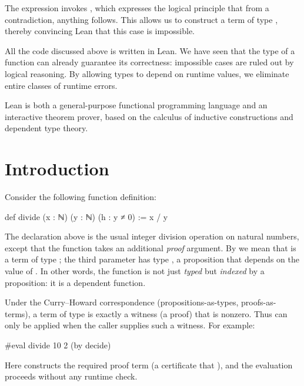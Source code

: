 The expression  invokes , which expresses
the logical principle that from a contradiction, anything follows. This allows us to construct a
term of type , thereby convincing Lean that this case is impossible.

\bigskip

All the code discussed above is written in Lean. We have seen that the type of a function can
already guarantee its correctness: impossible cases are ruled out by logical reasoning. By
allowing types to depend on runtime values, we eliminate entire classes of runtime errors.

Lean is both a general-purpose functional programming language and an interactive theorem
prover, based on the calculus of inductive constructions and dependent type theory.

\clearpage

\section{Introduction}

Consider the following function definition:

\begin{leanblock}
def divide (x : ℕ) (y : ℕ) (h : y ≠ 0) := x / y
\end{leanblock}

The declaration above is the usual integer division operation on natural numbers, except that the function takes an additional \emph{proof} argument. By  we mean that  is a term of type ; the third parameter  has type , a proposition that depends on the value of . In other words, the function is not just \emph{typed} but \emph{indexed} by a proposition: it is a dependent function.

Under the Curry–Howard correspondence (propositions-as-types, proofs-as-terms), a term of type  is exactly a witness (a proof) that  is nonzero. Thus  can only be applied when the caller supplies such a witness. For example:

\begin{leanblock}
#eval divide 10 2 (by decide)
\end{leanblock}

Here  constructs the required proof term (a certificate that ), and the evaluation proceeds without any runtime check.

\bigskip

